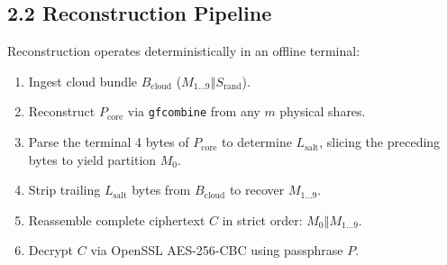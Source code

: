 \documentclass[11pt,a4paper,titlepage]{article}
\newif\ifja
\begin{document}
\subsection{%
  \ifja 2.2 復元アルゴリズム \else 2.2 Reconstruction Pipeline \fi
}
\ifja
復元パイプラインは、完全オフライン環境で以下のように実行される。
\begin{enumerate}
  \item クラウドから $B_{\text{cloud}}$（$M_1 \sim M_9$ ＋ ソルト）を取得する。
  \item $m$ 枚の物理プレートからシェア $S_i$ を集約し、\texttt{gfcombine} で $P_{\text{core}}$ を復元する。
  \item $P_{\text{core}}$ の末尾4バイトから $L_{\text{salt}}$ を取得し、手前の全バイトを $M_0$（先頭暗号ブロック）として確定抽出する。
  \item $B_{\text{cloud}}$ の末尾から $L_{\text{salt}}$ バイトを剥離して $M_{1\dots9}$ を取り出す。
  \item $\text{cat } M_0 \mathbin{\Vert} M_{1\dots9}$ の順序序列で結合し、元の完全暗号文 $C$ を復元する。
  \item パスフレーズ $P$ により AES-256-CBC 復号し、平文鍵を回収する。
\end{enumerate}
\else
Reconstruction operates deterministically in an offline terminal:
\begin{enumerate}
  \item Ingest cloud bundle $B_{\text{cloud}}$ ($M_{1\dots9} \mathbin{\Vert} S_{\text{rand}}$).
  \item Reconstruct $P_{\text{core}}$ via \texttt{gfcombine} from any $m$ physical shares.
  \item Parse the terminal 4 bytes of $P_{\text{core}}$ to determine $L_{\text{salt}}$, slicing the preceding bytes to yield partition $M_0$.
  \item Strip trailing $L_{\text{salt}}$ bytes from $B_{\text{cloud}}$ to recover $M_{1\dots9}$.
  \item Reassemble complete ciphertext $C$ in strict order: $M_0 \mathbin{\Vert} M_{1\dots9}$.
  \item Decrypt $C$ via OpenSSL AES-256-CBC using passphrase $P$.
\end{enumerate}
\fi
\end{document}
